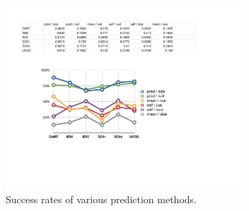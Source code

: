 \documentclass[conference]{IEEEtran}
\begin{document}
\begin{figure}[!b]
\vspace{-1em}
\begin{center}
\includegraphics[width=3.5in]{pred_stats}
\caption{Success rates of various prediction methods.}
\end{center}
\vspace{-0.9em}
\end{figure}

% 
\end{document}
